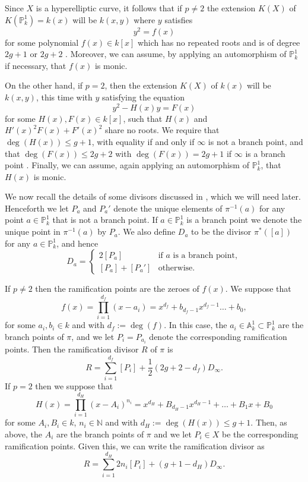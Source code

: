 \documentclass[draft, 11pt]{article} %
\theoremstyle{plain}
\theoremstyle{remark}
\begin{document}
Since $X$ is a hyperelliptic curve, it follows that if $p \neq 2$ the extension $K(X)$ of $K(\mathbb P_k^1) = k(x)$ will be $k(x,y)$ where $y$ satisfies
\begin{equation}\label{definingequationpnot2}
y^2 = f(x)
\end{equation}
for some polynomial $f(x) \in k[x]$ which has no repeated roots and is of degree $2g+1$ or $2g+2$ \cite[Prop 7.4.24]{liu}.
Moreover, we can assume, by applying an automorphism of $\mathbb P_k^1$ if necessary, that $f(x)$ is monic.

On the other hand, if $p=2$, then the extension $K(X)$ of $k(x)$ will be $k(x,y)$, this time with $y$ satisfying the equation
\begin{equation}\label{definep=2}
y^2 - H(x)y = F(x)
\end{equation}
for some $H(x),F(x) \in k[x]$, such that $H(x)$ and $H'(x)^2F(x) + F'(x)^2$ share no roots.
We require that $\deg(H(x)) \leq g+1$, with equality if and only if $\infty$ is not a branch point, and that $\deg(F(x)) \leq 2g+2$ with $\deg(F(x)) = 2g+1$ if $\infty$ is a branch point  \cite[Prop 7.4.24]{liu}.
Finally, we can assume, again applying an automorphism of $\mathbb P_k^1$, that $H(x)$ is monic.

We now recall the details of some divisors discussed in \cite{faithfulaction}, which we will need later.
Henceforth we let $P_a$ and $P_a'$ denote the unique elements of $\pi^{-1}(a)$ for any point $a \in \mathbb P_k^1$ that is not a branch point.
If $a \in \mathbb P_k^1$ is a branch point we denote the unique point in $\pi^{-1}(a)$ by $P_a$.
We also define $D_a$ to be the divisor $\pi^*\left([a]\right)$ for any $a \in \mathbb P_k^1$, and hence
\begin{equation*}
D_a= 
\begin{cases}
 2[P_a] & \text{if $a$ is a branch point}, \\
 [P_a] + [P_a'] & \text{otherwise.}
\end{cases}
\end{equation*}

If $p \neq 2$ then the ramification points are the zeroes of $f(x)$.
We suppose that 
\[
f(x) = \prod_{i=1}^{d_f} (x-a_i) = x^{d_f} + b_{d_f - 1}x^{d_f-1} \ldots + b_0,
\]
for some $a_i, b_i \in k$ and with $d_f := \deg(f) $.
In this case, the $a_i \in \mathbb A_k^1 \subset \mathbb P_k^1$ are the branch points of $\pi$, and we let $P_i = P_{a_i}$ denote the corresponding ramification points.
Then the ramification divisor $R$ of $\pi$ is
\[
R = \sum_{i=1}^{d_f} [P_i] + \frac{1}{2}(2g+2 - d_f)D_\infty.
\]
If $p=2$ then we suppose that
\begin{equation}\label{capitalh}
H(x) = \prod_{i=1}^{d_H} (x-A_i)^{n_i} = x^{d_H} + B_{{d_H}-1}x^{{d_H}-1} + \ldots + B_1x + B_0
\end{equation}
for some $A_i, B_i \in  k$, $n_i \in \mathbb N$ and with  ${d_H} := \deg(H(x)) \leq g+1$.
Then, as above, the $A_i$ are the branch points of $\pi$ and we let $P_i \in X$ be the corresponding ramification points.
Given this, we can write the ramification divisor as
\[
R = \sum_{i=1}^{d_H} 2n_i[P_i] + (g+1-{d_H})D_\infty.
\]
\end{document}
